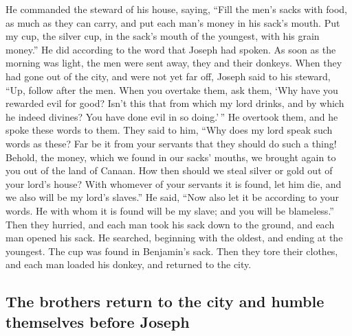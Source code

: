  He commanded the steward of his house, saying, ``Fill the
men's sacks with food, as much as they can carry, and put each man's
money in his sack's mouth.  Put my cup, the silver cup, in
the sack's mouth of the youngest, with his grain money.'' He did
according to the word that Joseph had spoken.  As soon as
the morning was light, the men were sent away, they and their donkeys.
 When they had gone out of the city, and were not yet far
off, Joseph said to his steward, ``Up, follow after the men. When you
overtake them, ask them, `Why have you rewarded evil for good?
 Isn't this that from which my lord drinks, and by which
he indeed divines? You have done evil in so doing.'\,'' 
He overtook them, and he spoke these words to them.  They
said to him, ``Why does my lord speak such words as these? Far be it
from your servants that they should do such a thing! 
Behold, the money, which we found in our sacks' mouths, we brought again
to you out of the land of Canaan. How then should we steal silver or
gold out of your lord's house?  With whomever of your
servants it is found, let him die, and we also will be my lord's
slaves.''  He said, ``Now also let it be according to
your words. He with whom it is found will be my slave; and you will be
blameless.''  Then they hurried, and each man took his
sack down to the ground, and each man opened his sack. 
He searched, beginning with the oldest, and ending at the youngest. The
cup was found in Benjamin's sack.  Then they tore their
clothes, and each man loaded his donkey, and returned to the city.

\hypertarget{the-brothers-return-to-the-city-and-humble-themselves-before-joseph}{%
\subsection{The brothers return to the city and humble themselves before
Joseph}\label{the-brothers-return-to-the-city-and-humble-themselves-before-joseph}}


